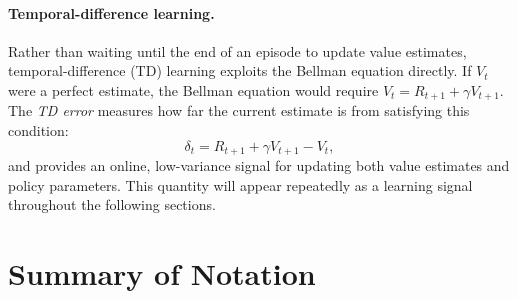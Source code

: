 \paragraph{Temporal-difference learning.}
Rather than waiting until the end of an episode to update value estimates,
temporal-difference (TD) learning exploits the Bellman equation directly.
If $V_t$ were a perfect estimate, the Bellman equation would require
$V_t = R_{t+1} + \gamma V_{t+1}$. The \emph{TD error} measures how far
the current estimate is from satisfying this condition:
\begin{equation}
    \delta_t = R_{t+1} + \gamma V_{t+1} - V_t,
\end{equation}
and provides an online, low-variance signal for updating both value estimates
and policy parameters. This quantity will appear repeatedly as a learning
signal throughout the following sections.

\clearpage
\section{Summary of Notation}

